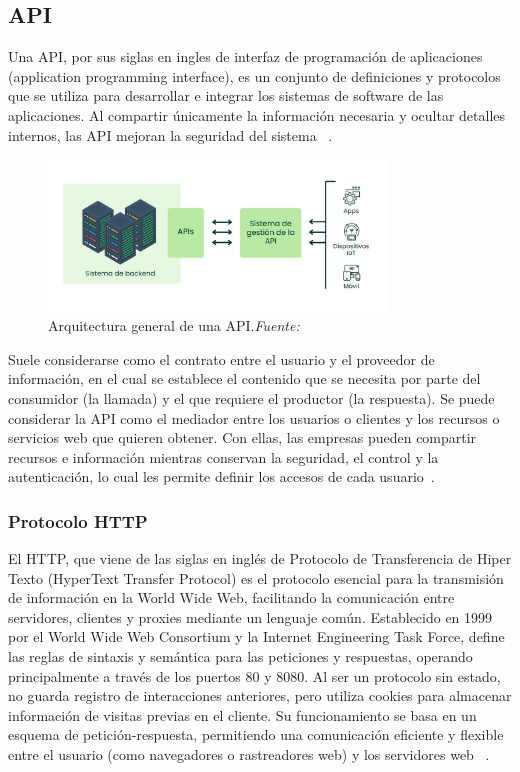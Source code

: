\subsection{API}
Una API, por sus siglas en ingles de interfaz de programación de aplicaciones (application programming interface), es un conjunto de definiciones y protocolos que se utiliza para desarrollar e integrar los sistemas de software de las aplicaciones. Al compartir únicamente la información necesaria y ocultar detalles internos, las API mejoran la seguridad del sistema ~\cite{APIDazzet}. 
\begin{figure}[H]
	\centering
	\includegraphics[width=0.8\textwidth]{img/chapter03/API-architecture.jpg}
	\caption[Arquitectura general de una API.]{Arquitectura general de una API.\textit{Fuente: ~\cite{APIDazzet}}}
	\label{fig:api_arqui}  %
\end{figure}
Suele considerarse como el contrato entre el usuario y el  proveedor de información, en el cual se establece el contenido que se necesita por parte del consumidor (la llamada) y el que requiere el productor (la respuesta). Se puede considerar la API como el mediador entre los usuarios o clientes y los recursos o servicios web que quieren obtener. Con ellas, las empresas pueden compartir recursos e información mientras conservan la seguridad, el control y la autenticación, lo cual les permite definir los accesos de cada usuario~\cite{APIDazzet}. 

\subsubsection{Protocolo HTTP}
El HTTP, que viene de las siglas en inglés de Protocolo de Transferencia de Hiper Texto (HyperText Transfer Protocol) es el protocolo esencial para la transmisión de información en la World Wide Web, facilitando la comunicación entre servidores, clientes y proxies mediante un lenguaje común. Establecido en 1999 por el World Wide Web Consortium y la Internet Engineering Task Force, define las reglas de sintaxis y semántica para las peticiones y respuestas, operando principalmente a través de los puertos 80 y 8080. Al ser un protocolo sin estado, no guarda registro de interacciones anteriores, pero utiliza cookies para almacenar información de visitas previas en el cliente. Su funcionamiento se basa en un esquema de petición-respuesta, permitiendo una comunicación eficiente y flexible entre el usuario (como navegadores o rastreadores web) y los servidores web ~\cite{HTTPEditorialEtece}.

